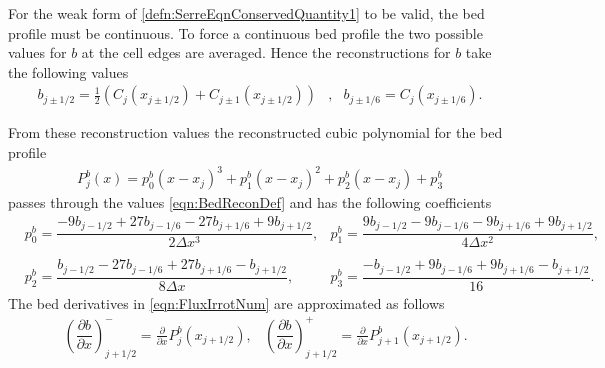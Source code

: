 \documentclass[times]{elsarticle}
\begin{document}
For the weak form of \eqref{defn:SerreEqnConservedQuantity1} to be valid, the bed profile must be continuous. To force a continuous bed profile the two possible values for $b$ at the cell edges are averaged. Hence the reconstructions for $b$ take the following values
\begin{align}
\label{eqn:BedReconDef}
b_{j\pm1/2} =  \frac{1}{2}\left( C_j(x_{j\pm 1/2}) + C_{j\pm 1}(x_{j\pm 1/2})\right)&,& 	b_{j\pm 1/6} =  C_j(x_{j\pm 1/6}).
\end{align}

From these reconstruction values the reconstructed cubic polynomial for the bed profile
\begin{align*}
P^b_j(x) = p^b_0 (x - x_j)^3 + p^b_1(x-x_j)^2 + p^b_2(x- x_j) + p^b_3
\end{align*}
passes through the values \eqref{eqn:BedReconDef} and has the following coefficients
\begin{align*}
&p^b_0 =  \dfrac{-9b_{j-1/2} + 27b_{j-1/6} - 27 b_{j+1/6} + 9b_{j+1/2}}{2 \Delta x^3}, 
&p^b_1 =  \dfrac{9b_{j-1/2} - 9b_{j-1/6} - 9b_{j+1/6} + 9b_{j+1/2}}{4 \Delta x^2},\\ \\ 
&p^b_2 =  \dfrac{b_{j-1/2} - 27b_{j-1/6} + 27 b_{j+1/6} - b_{j+1/2}}{8 \Delta x},
&p^b_3 =  \dfrac{-b_{j-1/2}  + 9b_{j-1/6} + 9 b_{j+1/6} - b_{j+1/2}}{16}.
\end{align*}
The bed derivatives in \eqref{eqn:FluxIrrotNum} are approximated as follows
\begin{align}
\label{eqn:PolyDerivb}
&\left(\dfrac{\partial {b}}{\partial x} \right)^-_{j + 1/2} = \frac{\partial }{\partial x}P^b_j(x_{j+1/2}), 
&\left(\dfrac{\partial {b}}{\partial x} \right)^+_{j + 1/2} = \frac{\partial }{\partial x}P^b_{j+1}(x_{j+1/2}). 
\end{align}
\end{document}
